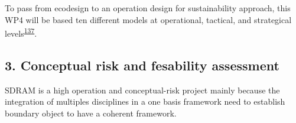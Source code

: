 \documentclass[
  12pt,
  a4paperpaper,
  onecolumn]{article}
\begin{document}
To pass from ecodesign to an operation design for sustainability
approach, this WP4 will be based ten different models at operational,
tactical, and strategical
levels\textsuperscript{\protect\hyperlink{ref-SousaRocha2019}{137}}.

\hypertarget{conceptual-risk-and-fesability-assessment}{%
\subsection{3. Conceptual risk and fesability
assessment}\label{conceptual-risk-and-fesability-assessment}}

SDRAM is a high operation and conceptual-risk project mainly because the
integration of multiples disciplines in a one basis framework need to
establish boundary object to have a coherent framework.

\small
\end{document}
